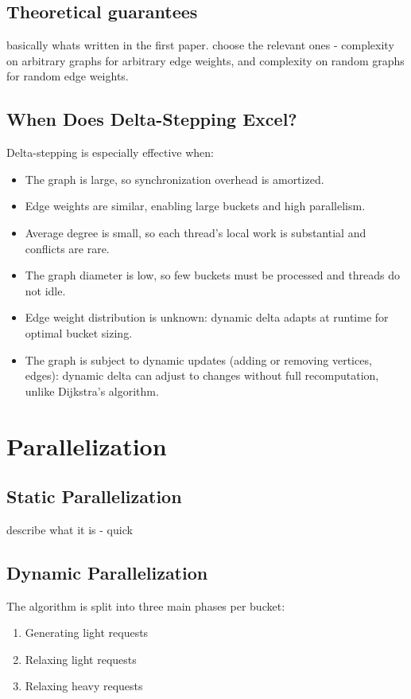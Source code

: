 \documentclass[12pt]{article}
\begin{document}
\subsection{Theoretical guarantees}
basically whats written in the first paper. choose the relevant ones - complexity on arbitrary graphs for arbitrary edge weights, and complexity on random graphs for random edge weights.

\subsection{When Does Delta-Stepping Excel?}
Delta-stepping is especially effective when:
\begin{itemize}
    \item The graph is large, so synchronization overhead is amortized.
    \item Edge weights are similar, enabling large buckets and high parallelism.
    \item Average degree is small, so each thread's local work is substantial and conflicts are rare.
    \item The graph diameter is low, so few buckets must be processed and threads do not idle.
    \item Edge weight distribution is unknown: dynamic delta adapts at runtime for optimal bucket sizing.
    \item The graph is subject to dynamic updates (adding or removing vertices, edges): dynamic delta can adjust to changes without full recomputation, unlike Dijkstra's algorithm.
\end{itemize}

\section{Parallelization}
\subsection{Static Parallelization}
 describe what it is - quick
\subsection{Dynamic Parallelization}
The algorithm is split into three main phases per bucket: 
\begin{enumerate}
    \item Generating light requests
    \item Relaxing light requests
    \item Relaxing heavy requests
\end{enumerate}
\end{document}
